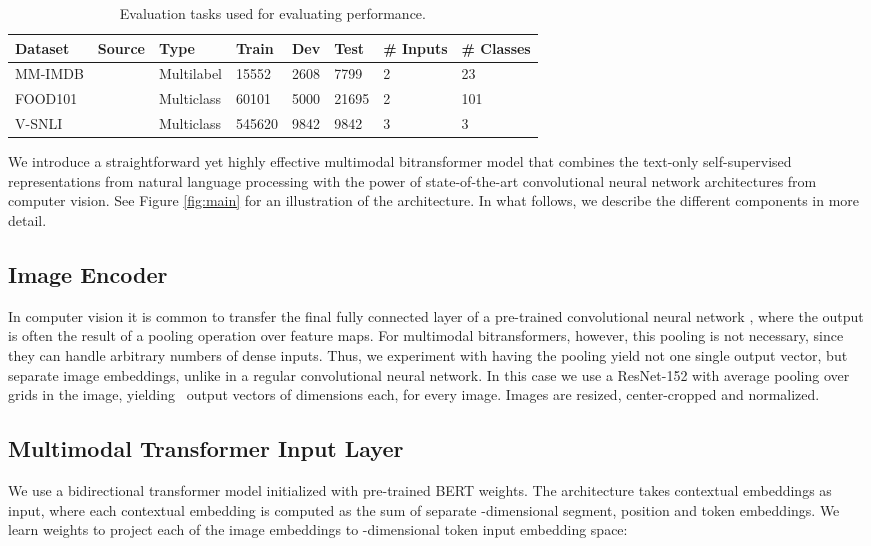 \documentclass[11pt,a4paper]{article}
\begin{document}
\begin{table*}[t]
    \centering\small
    \begin{tabular}{llllllll}
        \toprule
        \textbf{Dataset} & \textbf{Source} & \textbf{Type} & \textbf{Train} & \textbf{Dev} & \textbf{Test} & \textbf{\# Inputs} & \textbf{\# Classes}\\
        \midrule
        MM-IMDB & \cite{Arevalo:2017mmimdb} & Multilabel & 15552 & 2608 & 7799 & 2 & 23\\
        FOOD101 & \cite{Wang:2015food101} & Multiclass & 60101 & 5000 & 21695 & 2 & 101\\
V-SNLI & \cite{Vu:2018vsnli} & Multiclass & 545620 & 9842 & 9842 & 3 & 3\\
\bottomrule
    \end{tabular}
    \caption{Evaluation tasks used for evaluating performance.}
    \label{tab:dataset_stats}
\end{table*}

We introduce a straightforward yet highly effective multimodal bitransformer model that combines the text-only self-supervised representations from natural language processing with the power of state-of-the-art convolutional neural network architectures from computer vision. See Figure \ref{fig:main} for an illustration of the architecture. In what follows, we describe the different components in more detail.

\subsection{Image Encoder} In computer vision it is common to transfer the final fully connected layer of a pre-trained convolutional neural network \cite{Razavian:2014cvpr}, where the output is often the result of a pooling operation over feature maps. For multimodal bitransformers, however, this pooling is not necessary, since they can handle arbitrary numbers of dense inputs. Thus, we experiment with having the pooling yield not one single output vector, but  separate image embeddings, unlike in a regular convolutional neural network. In this case we use a ResNet-152 \cite{He:2016cvpr} with average pooling over  grids in the image, yielding ~output vectors of  dimensions each, for every image. Images are resized, center-cropped and normalized.

\subsection{Multimodal Transformer Input Layer} We use a bidirectional transformer model initialized with pre-trained BERT weights. The architecture takes contextual embeddings as input, where each contextual embedding is computed as the sum of separate -dimensional segment, position and token embeddings. We learn weights  to project each of the  image embeddings to -dimensional token input embedding space:
\end{document}
